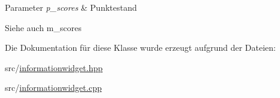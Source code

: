 \begin{DoxyParams}{Parameter}
{\em p\+\_\+scores} & Punktestand \\
\hline
\end{DoxyParams}
\begin{DoxySeeAlso}{Siehe auch}
m\+\_\+scores 
\end{DoxySeeAlso}


Die Dokumentation für diese Klasse wurde erzeugt aufgrund der Dateien\+:\begin{DoxyCompactItemize}
\item 
src/\hyperlink{informationwidget_8hpp}{informationwidget.\+hpp}\item 
src/\hyperlink{informationwidget_8cpp}{informationwidget.\+cpp}\end{DoxyCompactItemize}
